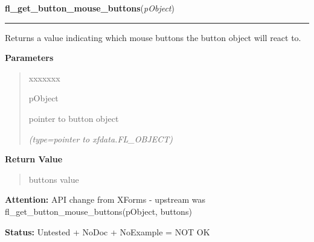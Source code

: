 \hspace{.8\funcindent}\begin{boxedminipage}{\funcwidth}

    \raggedright \textbf{fl\_get\_button\_mouse\_buttons}(\textit{pObject})

    \vspace{-1.5ex}

    \rule{\textwidth}{0.5\fboxrule}
\setlength{\parskip}{2ex}
    Returns a value indicating which mouse buttons the button object will 
    react to.

\setlength{\parskip}{1ex}
      \textbf{Parameters}
      \vspace{-1ex}

      \begin{quote}
        \begin{Ventry}{xxxxxxx}

          \item[pObject]

          pointer to button object

            {\it (type=pointer to xfdata.FL\_OBJECT)}

        \end{Ventry}

      \end{quote}

      \textbf{Return Value}
    \vspace{-1ex}

      \begin{quote}
      buttons value

      \end{quote}

\textbf{Attention:} API change from XForms - upstream was 
fl\_get\_button\_mouse\_buttons(pObject, buttons)



\textbf{Status:} Untested + NoDoc + NoExample = NOT OK



    \end{boxedminipage}

    \label{xformslib:library:fl_create_generic_canvas}

    \vspace{0.5ex}

